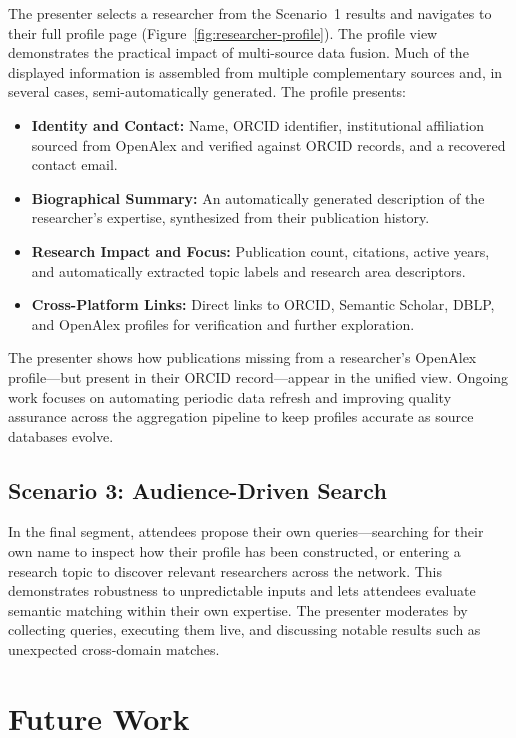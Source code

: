 \documentclass[sigconf, nonacm]{acmart}
\begin{document}
The presenter selects a researcher from the Scenario~1 results and navigates to their full profile page (Figure~\ref{fig:researcher-profile}). The profile view demonstrates the practical impact of multi-source data fusion. Much of the displayed information is assembled from multiple complementary sources and, in several cases, semi-automatically generated. The profile presents:
\begin{itemize}
    \item \textbf{Identity and Contact:} Name, ORCID identifier, institutional affiliation sourced from OpenAlex and verified against ORCID records, and a recovered contact email.
    \item \textbf{Biographical Summary:} An automatically generated description of the researcher's expertise, synthesized from their publication history.
    \item \textbf{Research Impact and Focus:} Publication count, citations, active years, and automatically extracted topic labels and research area descriptors.
    \item \textbf{Cross-Platform Links:} Direct links to ORCID, Semantic Scholar, DBLP, and OpenAlex profiles for verification and further exploration.
\end{itemize}

The presenter shows how publications missing from a researcher's OpenAlex profile---but present in their ORCID record---appear in the unified view. Ongoing work focuses on automating periodic data refresh and improving quality assurance across the aggregation pipeline to keep profiles accurate as source databases evolve.

\subsection{Scenario 3: Audience-Driven Search}
\label{sec:scenario3}

In the final segment, attendees propose their own queries---searching for their own name to inspect how their profile has been constructed, or entering a research topic to discover relevant researchers across the network. This demonstrates robustness to unpredictable inputs and lets attendees evaluate semantic matching within their own expertise. The presenter moderates by collecting queries, executing them live, and discussing notable results such as unexpected cross-domain matches.

\section{Future Work}
\end{document}
